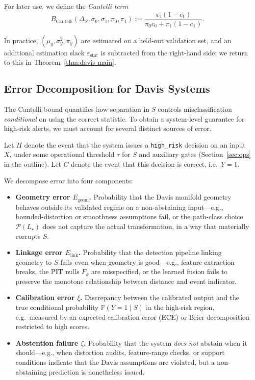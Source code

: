 \documentclass[11pt]{article}
\newcommand{\Prob}{\mathbb{P}}
\theoremstyle{remark}
\theoremstyle{plain}
\begin{document}
For later use, we define the \emph{Cantelli term}
\[
B_{\mathrm{Cantelli}}(\Delta_S,\sigma_0,\sigma_1,\pi_0,\pi_1)
:= \frac{\pi_1 (1-c_1)}{\pi_0 c_0 + \pi_1 (1-c_1)}.
\]

In practice, $(\mu_y,\sigma_y^2,\pi_y)$ are estimated on a held-out validation set, and an
additional estimation slack $\varepsilon_{\mathrm{stat}}$ is subtracted from the right-hand side; we
return to this in Theorem~\ref{thm:davis-main}.

\subsection{Error Decomposition for Davis Systems}

The Cantelli bound quantifies how separation in $S$ controls misclassification \emph{conditional} on
using the correct statistic. To obtain a system-level guarantee for high-risk alerts, we must account
for several distinct sources of error.

Let $H$ denote the event that the system issues a \texttt{high\_risk} decision on an input $X$,
under some operational threshold $\tau$ for $S$ and auxiliary gates (Section~\ref{sec:ops} in the
outline). Let $C$ denote the event that this decision is correct, i.e.\ $Y=1$.

We decompose error into four components:
\begin{itemize}[leftmargin=2em]
  \item \textbf{Geometry error $E_{\mathrm{geom}}$.}
    Probability that the Davis manifold geometry behaves outside its validated regime on a
    non-abstaining input—e.g., bounded-distortion or smoothness assumptions fail, or the
    path-class choice $\mathcal{P}(L_\star)$ does not capture the actual transformation, in
    a way that materially corrupts $S$.

  \item \textbf{Linkage error $E_{\mathrm{link}}$.}
    Probability that the detection pipeline linking geometry to $S$ fails even when geometry
    is good—e.g., feature extraction breaks, the PIT nulls $F_k$ are misspecified, or the
    learned fusion fails to preserve the monotone relationship between distance and event
    indicator.

  \item \textbf{Calibration error $\xi$.}
    Discrepancy between the calibrated output and the true conditional probability
    $\Prob(Y=1 \mid S)$ in the high-risk region, e.g.\ measured by an expected calibration
    error (ECE) or Brier decomposition restricted to high scores.

  \item \textbf{Abstention failure $\zeta$.}
    Probability that the system \emph{does not} abstain when it should—e.g., when distortion
    audits, feature-range checks, or support conditions indicate that the Davis assumptions
    are violated, but a non-abstaining prediction is nonetheless issued.
\end{itemize}
\end{document}
